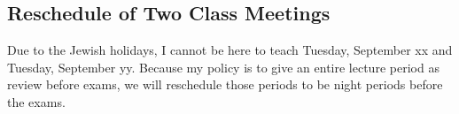 \subsection*{Reschedule of Two Class Meetings}

Due to the Jewish holidays, I cannot be here to teach Tuesday, September xx and Tuesday, September yy. Because my policy is to give an entire lecture period as review before exams, we will reschedule those periods to be night periods before the exams.